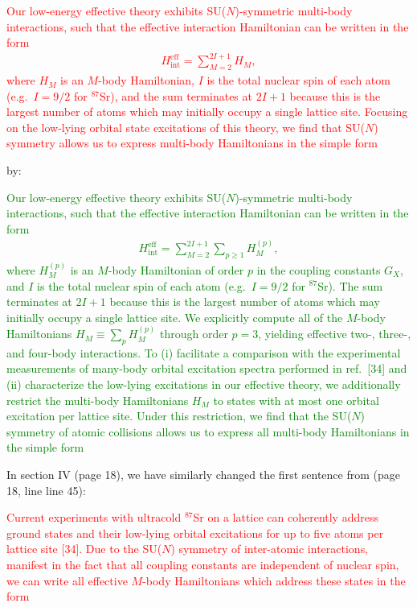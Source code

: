 \documentclass[preprint]{revtex4-1}
\renewcommand{\t}{\text} %
\newcommand{\1}{\mathds{1}}
\newcommand{\red}[1]{\textcolor{red}{#1}}
\newcommand{\green}[1]{\textcolor{green}{#1}}
\begin{document}
\begin{enumerate}
  \red{Our low-energy effective theory exhibits SU($N$)-symmetric
    multi-body interactions, such that the effective interaction
    Hamiltonian can be written in the form
    \begin{align*}
      H_{\t{int}}^{\t{eff}} = \sum_{M=2}^{2I+1} H_M, \tag{9}
    \end{align*}
    where $H_M$ is an $M$-body Hamiltonian, $I$ is the total nuclear
    spin of each atom (e.g.~$I=9/2$ for ${}^{87}$Sr), and the sum
    terminates at $2I+1$ because this is the largest number of atoms
    which may initially occupy a single lattice site.  Focusing on the
    low-lying orbital state excitations of this theory, we find that
    SU($N$) symmetry allows us to express multi-body Hamiltonians in
    the simple form}

  by:

  \green{Our low-energy effective theory exhibits SU($N$)-symmetric
    multi-body interactions, such that the effective interaction
    Hamiltonian can be written in the form
    \begin{align*}
      H_{\t{int}}^{\t{eff}} = \sum_{M=2}^{2I+1} \sum_{p\ge1} H_M^{(p)},
      \tag{9}
    \end{align*}
    where $H_M^{(p)}$ is an $M$-body Hamiltonian of order $p$ in the
    coupling constants $G_X$, and $I$ is the total nuclear spin of
    each atom (e.g.~$I=9/2$ for ${}^{87}$Sr).  The sum terminates at
    $2I+1$ because this is the largest number of atoms which may
    initially occupy a single lattice site.  We explicitly compute all
    of the $M$-body Hamiltonians $H_M\equiv\sum_p H_M^{(p)}$ through
    order $p=3$, yielding effective two-, three-, and four-body
    interactions.  To (i) facilitate a comparison with the
    experimental measurements of many-body orbital excitation spectra
    performed in ref.~[34] and (ii) characterize the low-lying
    excitations in our effective theory, we additionally restrict the
    multi-body Hamiltonians $H_M$ to states with at most one orbital
    excitation per lattice site.  Under this restriction, we find that
    the SU($N$) symmetry of atomic collisions allows us to express all
    multi-body Hamiltonians in the simple form}

  In section IV (page 18), we have similarly changed the first
  sentence from (page 18, line line 45):

  \red{Current experiments with ultracold ${}^{87}$Sr on a lattice can
    coherently address ground states and their low-lying orbital
    excitations for up to five atoms per lattice site [34].  Due to
    the SU($N$) symmetry of inter-atomic interactions, manifest in the
    fact that all coupling constants are independent of nuclear spin,
    we can write all effective $M$-body Hamiltonians which address
    these states in the form}


\end{enumerate}
\end{document}
